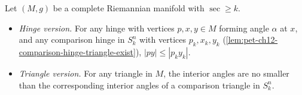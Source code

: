 \begin{theorem}
  \label{thm:pet-ch12-toponogov}
  Let $(M,g)$ be a complete Riemannian manifold with $\sec\ge k$.
  \begin{itemize}
    \item \emph{Hinge version.} For any hinge with vertices $p,x,y\in M$ forming
      angle $\alpha$ at $x$, and any comparison hinge in $S_k^n$ with vertices
      $p_k,x_k,y_k$ (\cref{lem:pet-ch12-comparison-hinge-triangle-exist}),
      $|py|\le|p_ky_k|$.
    \item \emph{Triangle version.} For any triangle in $M$, the interior angles
      are no smaller than the corresponding interior angles of a comparison
      triangle in $S_k^n$.
  \end{itemize}
\end{theorem}
